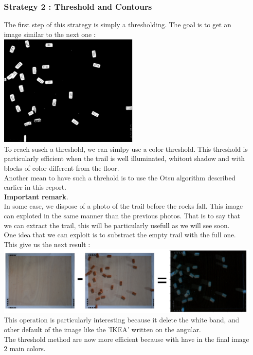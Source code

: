 \documentclass{article}
\begin{document}
\subsubsection{Strategy 2 : Threshold and Contours}

The first step of this strategy is simply a thresholding. The goal is to get an image similar to the next one :\\
\includegraphics[width=7cm]{images/img23.png} \\
To reach susch a threshold, we can simlpy use a color threshold. This threshold is particularly efficient when the trail is well illuminated, whitout shadow and with blocks of color different from the floor.\\
Another mean to have such a threhold is to use the Otsu algorithm described earlier in this report.\\

\textbf{Important remark}.\\
In some case, we dispose of a photo of the trail before the rocks fall. This image can exploted in the same manner than the previous photos. That is to say that we can extract the trail, this will be particularly usefull as we will see soon.\\

One idea that we can exploit is to substract the empty trail with the full one. This give us the next result :\\ 

\includegraphics[width=14cm]{images/img22.png} \\
This operation is particularly interesting because it delete the white band, and other default of the image like the 'IKEA' written on the angular.\\
The threshold method are now more efficient because with have in the final image $2$ main colors.\\
\end{document}
